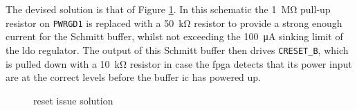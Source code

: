 The devised solution is that of Figure \ref{fig:fpga-reset-sol}. In this schematic the \SI{1}{\mega\ohm} pull-up resistor on \texttt{PWRGD1} is replaced with a \SI{50}{\kilo\ohm} resistor to provide a strong enough current for the Schmitt buffer, whilst not exceeding the \SI{100}{\micro\ampere} sinking limit of the \gls{ldo} regulator. The output of this Schmitt buffer then drives \texttt{CRESET\_B}, which is pulled down with a \SI{10}{\kilo\ohm} resistor in case the \gls{fpga} detects that its power input are at the correct levels before the buffer \gls{ic} has powered up.


\begin{figure}[ht]
	\centering
	\caption{ reset issue solution}
	\label{fig:fpga-reset-sol}
\end{figure}


